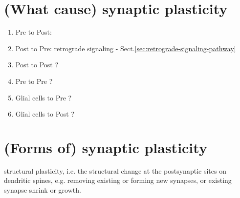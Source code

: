   

\section{(What cause) synaptic plasticity}

\begin{enumerate}
  \item Pre to Post:
  
  \item Post to Pre: retrograde signaling - Sect.\ref{sec:retrograde-signaling-pathway}
  
  \item Post to Post ?
  
  \item Pre to Pre ?
  
  \item Glial cells to Pre ?
  
  \item Glial cells to Post ?
\end{enumerate}


\section{(Forms of) synaptic plasticity}


 structural plasticity, i.e.
  the structural change at the postsynaptic sites on dendritic spines, e.g. removing existing or forming new synapses, or
  existing synapse shrink or growth.
  

